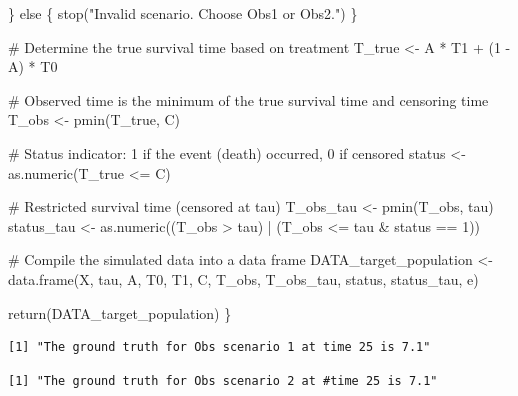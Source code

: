 \documentclass[
  11pt,
  a4paper,
]{article}
\newenvironment{Shaded}{}{}
\newcommand{\CommentTok}[1]{\textcolor[rgb]{0.42,0.45,0.49}{#1}}
\newcommand{\ControlFlowTok}[1]{\textcolor[rgb]{0.84,0.23,0.29}{#1}}
\newcommand{\DecValTok}[1]{\textcolor[rgb]{0.00,0.36,0.77}{#1}}
\newcommand{\FunctionTok}[1]{\textcolor[rgb]{0.44,0.26,0.76}{#1}}
\newcommand{\NormalTok}[1]{\textcolor[rgb]{0.14,0.16,0.18}{#1}}
\newcommand{\OtherTok}[1]{\textcolor[rgb]{0.44,0.26,0.76}{#1}}
\newcommand{\SpecialCharTok}[1]{\textcolor[rgb]{0.00,0.36,0.77}{#1}}
\newcommand{\StringTok}[1]{\textcolor[rgb]{0.01,0.18,0.38}{#1}}
\theoremstyle{plain}
\theoremstyle{plain}
\theoremstyle{plain}
\theoremstyle{definition}
\theoremstyle{remark}
\begin{document}
\begin{Shaded}
\begin{Highlighting}[]
\NormalTok{  \} }\ControlFlowTok{else}\NormalTok{ \{}
    \FunctionTok{stop}\NormalTok{(}\StringTok{"Invalid scenario. Choose \textquotesingle{}Obs1\textquotesingle{} or \textquotesingle{}Obs2\textquotesingle{}."}\NormalTok{)}
\NormalTok{  \}}
  
  \CommentTok{\# Determine the true survival time based on treatment}
\NormalTok{  T\_true }\OtherTok{\textless{}{-}}\NormalTok{ A }\SpecialCharTok{*}\NormalTok{ T1 }\SpecialCharTok{+}\NormalTok{ (}\DecValTok{1} \SpecialCharTok{{-}}\NormalTok{ A) }\SpecialCharTok{*}\NormalTok{ T0}
  
  \CommentTok{\# Observed time is the minimum of the true survival time and censoring time}
\NormalTok{  T\_obs }\OtherTok{\textless{}{-}} \FunctionTok{pmin}\NormalTok{(T\_true, C)}
  
  \CommentTok{\# Status indicator: 1 if the event (death) occurred, 0 if censored}
\NormalTok{  status }\OtherTok{\textless{}{-}} \FunctionTok{as.numeric}\NormalTok{(T\_true }\SpecialCharTok{\textless{}=}\NormalTok{ C)}
  
  \CommentTok{\# Restricted survival time (censored at tau)}
\NormalTok{  T\_obs\_tau }\OtherTok{\textless{}{-}} \FunctionTok{pmin}\NormalTok{(T\_obs, tau)}
\NormalTok{  status\_tau }\OtherTok{\textless{}{-}} \FunctionTok{as.numeric}\NormalTok{((T\_obs }\SpecialCharTok{\textgreater{}}\NormalTok{ tau) }\SpecialCharTok{|}\NormalTok{ (T\_obs }\SpecialCharTok{\textless{}=}\NormalTok{ tau }\SpecialCharTok{\&}\NormalTok{ status }\SpecialCharTok{==} \DecValTok{1}\NormalTok{))}
  
  \CommentTok{\# Compile the simulated data into a data frame}
\NormalTok{  DATA\_target\_population }\OtherTok{\textless{}{-}} \FunctionTok{data.frame}\NormalTok{(X, tau, A, T0, T1, C, T\_obs, T\_obs\_tau, }
\NormalTok{                                       status, status\_tau, e)}
  
  \FunctionTok{return}\NormalTok{(DATA\_target\_population)}
\NormalTok{\}}
\end{Highlighting}
\end{Shaded}

\begin{verbatim}
[1] "The ground truth for Obs scenario 1 at time 25 is 7.1"
\end{verbatim}

\begin{verbatim}
[1] "The ground truth for Obs scenario 2 at #time 25 is 7.1"
\end{verbatim}
\end{document}
